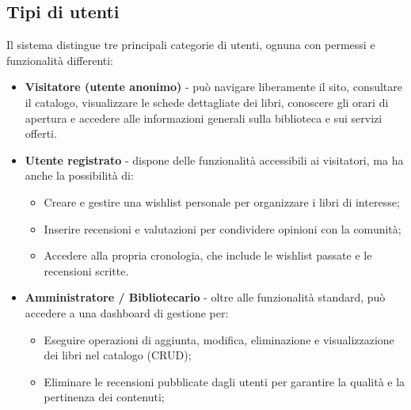 \documentclass{article}
\begin{document}
\subsection{Tipi di utenti}
Il sistema distingue tre principali categorie di utenti, ognuna con permessi e funzionalità differenti:
\begin{itemize}
    \item \textbf{Visitatore (utente anonimo)} - può navigare liberamente il sito, consultare il catalogo, visualizzare le schede dettagliate dei libri, conoscere gli orari di apertura e accedere alle informazioni generali sulla biblioteca e sui servizi offerti.  
    \item \textbf{Utente registrato} - dispone delle funzionalità accessibili ai visitatori, ma ha anche la possibilità di:
          \begin{itemize}
              \item Creare e gestire una wishlist personale per organizzare i libri di interesse;
              \item Inserire recensioni e valutazioni per condividere opinioni con la comunità;
              \item Accedere alla propria cronologia, che include le wishlist passate e le recensioni scritte.
          \end{itemize}
    \item \textbf{Amministratore / Bibliotecario} - oltre alle funzionalità standard, può accedere a una dashboard di gestione per:
          \begin{itemize}
              \item Eseguire operazioni di aggiunta, modifica, eliminazione e visualizzazione dei libri nel catalogo (CRUD);
              \item Eliminare le recensioni pubblicate dagli utenti per garantire la qualità e la pertinenza dei contenuti;
          \end{itemize}
\end{itemize}
\end{document}
